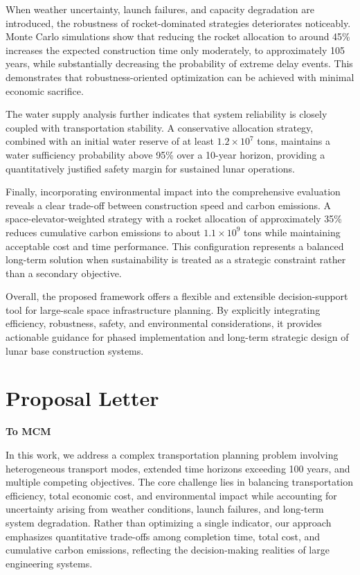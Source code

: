 \documentclass[12pt]{article}
\begin{document}
When weather uncertainty, launch failures, and capacity degradation are introduced, the robustness of rocket-dominated strategies deteriorates noticeably. Monte Carlo simulations show that reducing the rocket allocation to around 45\% increases the expected construction time only moderately, to approximately 105 years, while substantially decreasing the probability of extreme delay events. This demonstrates that robustness-oriented optimization can be achieved with minimal economic sacrifice.

The water supply analysis further indicates that system reliability is closely coupled with transportation stability. A conservative allocation strategy, combined with an initial water reserve of at least $1.2 \times 10^{7}$ tons, maintains a water sufficiency probability above 95\% over a 10-year horizon, providing a quantitatively justified safety margin for sustained lunar operations.

Finally, incorporating environmental impact into the comprehensive evaluation reveals a clear trade-off between construction speed and carbon emissions. A space-elevator-weighted strategy with a rocket allocation of approximately 35\% reduces cumulative carbon emissions to about $1.1 \times 10^{9}$ tons while maintaining acceptable cost and time performance. This configuration represents a balanced long-term solution when sustainability is treated as a strategic constraint rather than a secondary objective.

Overall, the proposed framework offers a flexible and extensible decision-support tool for large-scale space infrastructure planning. By explicitly integrating efficiency, robustness, safety, and environmental considerations, it provides actionable guidance for phased implementation and long-term strategic design of lunar base construction systems.

\newpage
\section*{Proposal Letter}

\noindent
\textbf{To MCM}

\vspace{0.5em}

\noindent
In this work, we address a complex transportation planning problem involving heterogeneous transport modes, extended time horizons exceeding 100 years, and multiple competing objectives. The core challenge lies in balancing transportation efficiency, total economic cost, and environmental impact while accounting for uncertainty arising from weather conditions, launch failures, and long-term system degradation. Rather than optimizing a single indicator, our approach emphasizes quantitative trade-offs among completion time, total cost, and cumulative carbon emissions, reflecting the decision-making realities of large engineering systems.
\end{document}
